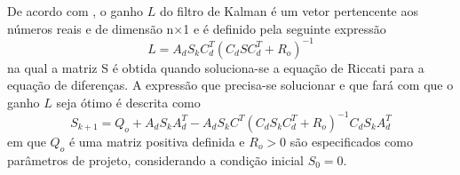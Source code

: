 De acordo com \cite{Kim:13}, o ganho $L$ do filtro de Kalman é um vetor pertencente aos números reais e de dimensão n$\times$1 e é definido pela seguinte expressão
\begin{equation}\label{eq:Ganho1LQE}
    L = A_dS_kC_d^T(C_dSC_d^T + R_o)^{-1}
\end{equation}{}
na qual a matriz S é obtida quando soluciona-se a equação de Riccati
para a equação de diferenças. A expressão que precisa-se solucionar e que fará com que o ganho $L$ seja ótimo é descrita como
\begin{equation}\label{eq:MatrizMinimizaçãoLQE}
    S_{k+1} = Q_o + A_dS_kA_d^T - A_dS_kC^T(C_dS_kC_d^T + R_o)^{-1}C_dS_kA_d^T
\end{equation}{}
em que $Q_o$ é uma matriz positiva definida e $R_o > 0$ são especificados como parâmetros de projeto, considerando a condição inicial $S_0 = 0$.










